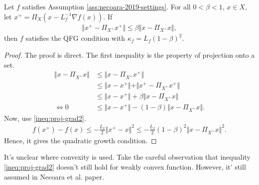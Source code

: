 \documentclass[12pt]{report}
\begin{document}
            \begin{theorem}\label{thm:qfg-suff}
                Let $f$ satisfies Assumption \ref{ass:necoara-2019-settings}. 
                For all $0 < \beta < 1$, $x \in X$, let $x^+ = \Pi_{X}(x - L^{-1}_f \nabla f(x))$. 
                If 
                \begin{align*}
                    \Vert x^+ - \Pi_{X^+}x^+\Vert \le \beta \Vert x - \Pi_{X^+}x \Vert, 
                \end{align*}
                then $f$ satisfies the QFG condition with $\kappa_f = L_f(1 - \beta)^2$. 
            \end{theorem}
            \begin{proof}
                The proof is direct. 
                The first inequality is the property of projection onto a set. 
                \begin{align*}
                    \Vert x - \Pi_{X^+}x\Vert 
                    &\le \Vert x - \Pi_{X^+}x^+\Vert
                    \\
                    &\le \Vert x - x^+\Vert + \Vert x^+ - \Pi_{X^+}x^+\Vert
                    \\
                    &\le \Vert x - x^+\Vert + \beta \Vert x - \Pi_{X^+}x\Vert
                    \\
                    \iff 
                    0 &\le \Vert x - x^+\Vert - (1 - \beta) \Vert x - \Pi_{X^+}x\Vert. 
                \end{align*}
                Now, use \eqref{ineq:proj-grad2}. 
                \begin{align*}
                    f(x^+) - f(x) 
                    \le - \frac{L_f}{2}\Vert x^+ - x\Vert^2 
                    \le - \frac{L_f}{2}(1 - \beta)^2 \Vert x - \Pi_{X^+}x\Vert^2. 
                \end{align*}
                Hence, it gives the quadratic growth condition. 
            \end{proof}
            \begin{remark}
                It's unclear where convexity is used. 
                Take the careful observation that inequality \eqref{ineq:proj-grad2} doesn't still hold for weakly convex function. 
                However, it' still assumed in Necoara et al. paper. 
            \end{remark}
\end{document}
